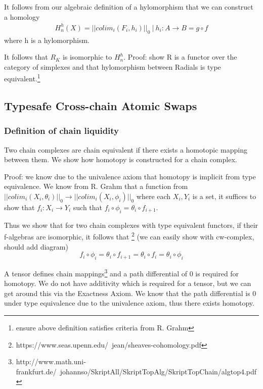 \documentclass{article}
\begin{document}
It follows from our algebraic definition of a hylomorphism that we can construct a homology
\begin{equation} \label{eq1}
\begin{split}
H^{h}_n(X) = || colim_i (F_i, h_i) ||_0 \ | \ h_i: A \rightarrow B = g \circ f
\end{split}
\end{equation}
where h is a hylomorphism.

It follows that $R_K$ is isomorphic to $H^{h}_n$. Proof: show R is a functor over the category of simplexes and that hylomorphism between Radials is type equivalent.\footnote{ensure above definition satisfies criteria from R. Grahm}

\subsection{Typesafe Cross-chain Atomic Swaps}
\subsubsection{Definition of chain liquidity}
Two chain complexes are chain equivalent if there exists a homotopic mapping between them. We show how homotopy is constructed for a chain complex.

Proof: we know due to the univalence axiom that homotopy is implicit from type equivalence. We know from R. Grahm that a function from $|| colim_i (X_i,\theta_i) ||_0 \rightarrow || colim_i (X_i,\phi_i) ||_0$ where each $ X_i,Y_i $ is a set, it suffices to show that $f_i: X_i  \rightarrow Y_i$ such that $ f_i \circ \phi_i =  \theta_i \circ f_{i+1}$.

Thus we show that for two chain complexes with type equivalent functors, if their f-algebras are isomorphic, it follows that \footnote{https://www.seas.upenn.edu/~jean/sheaves-cohomology.pdf} (we can easily show with cw-complex, should add diagram)
\begin{equation}
f_i \circ \phi_i =  \theta_i \circ f_{i+1} = \theta_i \circ f_i =  \theta_i \circ \phi_i
\end{equation}

A tensor defines chain mappings\footnote{http://www.math.uni-frankfurt.de/~johannso/SkriptAll/SkriptTopAlg/SkriptTopChain/algtop4.pdf} and a path differential of 0 is required for homotopy. We do not have additivity which is required for a tensor, but we can get around this via the Exactness Axiom. We know that the path differential is 0 under type equivalence due to the univalence axiom, thus there exists homotopy.
\end{document}
